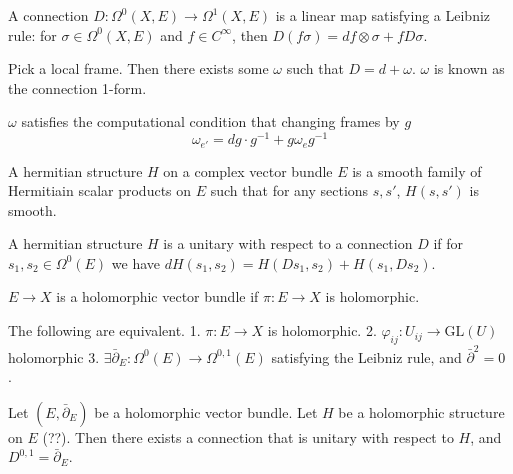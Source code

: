 \begin{definition}
    A connection $ D: \Omega^0 ( X, E) \rightarrow  \Omega ^1 ( X, E) $ is a linear map satisfying a Leibniz rule:
    for $ \sigma \in \Omega^0 ( X, E) $ and $f \in C^\infty $, then 
    $ D(f \sigma) = df \otimes \sigma + f D\sigma$. 
\end{definition}

Pick a local frame. 
Then there exists some $\omega$ such that $ D = d + \omega $. 
$\omega $ is known as the connection 1-form. 

$\omega $ satisfies the computational condition that changing frames by $g$ 
\begin{equation}
    \omega _ {e'} = dg \cdot g^{-1} + g \omega_e g^{-1} 
\end{equation}

\begin{definition}
    A hermitian structure $H$ on a complex vector bundle $ E$ is a smooth family of 
    Hermitiain scalar products on $E$ such that for any sections $ s, s'$, $ H(s,s') $ is smooth. 
\end{definition}

\begin{definition}
    A hermitian structure $H$ is a unitary with respect to a connection $D$ if 
    for $ s_1, s_2 \in \Omega^0 (E) $ we have $ dH(s_1, s_2 ) = H(Ds_1, s_2) + H(s_1, Ds_2)$.
\end{definition}

\begin{definition}
    $E \rightarrow  X$ is a holomorphic vector bundle if $ \pi: E \rightarrow X $ is holomorphic. 

\end{definition}

\begin{proposition}
    The following are equivalent. 
    1. $ \pi : E \rightarrow X $ is holomorphic.
    2. $ \varphi_{ij} : U_{ij} \rightarrow \mathrm{GL}(U) $ holomorphic
    3. $ \exists \bar{\partial} _E : \Omega ^0 ( E) \rightarrow \Omega ^{0,1} ( E) $ 
    satisfying the Leibniz rule, and $ \bar{\partial} ^2  = 0 $ .
\end{proposition}

\begin{theorem}
    Let $ (E, \bar{\partial}_E ) $ be a holomorphic vector bundle. 
    Let $H$ be a holomorphic structure on $E$ (??). 
    Then there exists a connection that is unitary with respect to $H$, 
    and $D^{0,1} = \bar{\partial}_E$.
\end{theorem}

